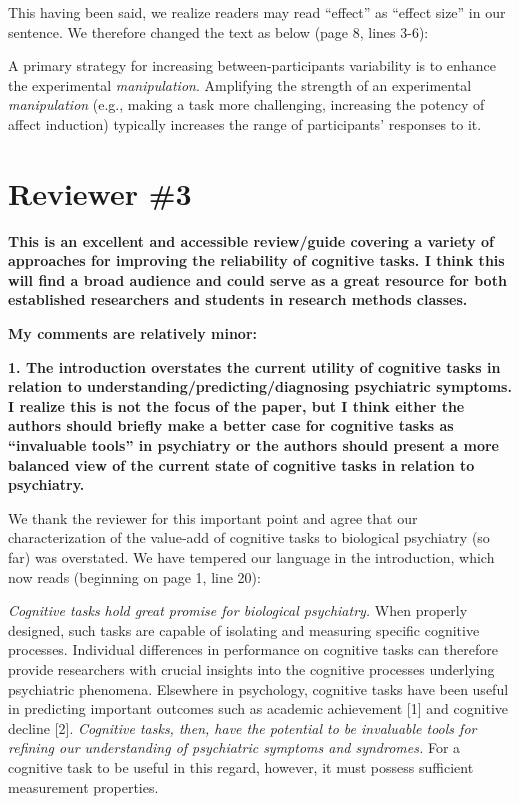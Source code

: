 \documentclass[a4paper,12pt]{article}
\begin{document}
This having been said, we realize readers may read ``effect'' as ``effect size'' in our sentence. We therefore changed the text as below (page 8, lines 3-6): 

\begin{displayquote}
    A primary strategy for increasing between-participants variability is to enhance the experimental \textit{manipulation}. Amplifying the strength of an experimental \textit{manipulation} (e.g., making a task more challenging, increasing the potency of affect induction) typically increases the range of participants' responses to it.
\end{displayquote}

\section*{Reviewer \#3}

\textbf{This is an excellent and accessible review/guide covering a variety of approaches for improving the reliability of cognitive tasks. I think this will find a broad audience and could serve as a great resource for both established researchers and students in research methods classes.}

\textbf{My comments are relatively minor:}

\textbf{1. The introduction overstates the current utility of cognitive tasks in relation to understanding/predicting/diagnosing psychiatric symptoms. I realize this is not the focus of the paper, but I think either the authors should briefly make a better case for cognitive tasks as ``invaluable tools'' in psychiatry or the authors should present a more balanced view of the current state of cognitive tasks in relation to psychiatry.}

We thank the reviewer for this important point and agree that our characterization of the value-add of cognitive tasks to biological psychiatry (so far) was overstated. We have tempered our language in the introduction, which now reads (beginning on page 1, line 20):

\begin{displayquote}
\textit{Cognitive tasks hold great promise for biological psychiatry.} When properly designed, such tasks are capable of isolating and measuring specific cognitive processes. Individual differences in performance on cognitive tasks can therefore provide researchers with crucial insights into the cognitive processes underlying psychiatric phenomena. Elsewhere in psychology, cognitive tasks have been useful in predicting important outcomes such as academic achievement [1] and cognitive decline [2]. \textit{Cognitive tasks, then, have the potential to be invaluable tools for refining our understanding of psychiatric symptoms and syndromes.} For a cognitive task to be useful in this regard, however, it must possess sufficient measurement properties.
\end{displayquote}
\end{document}
